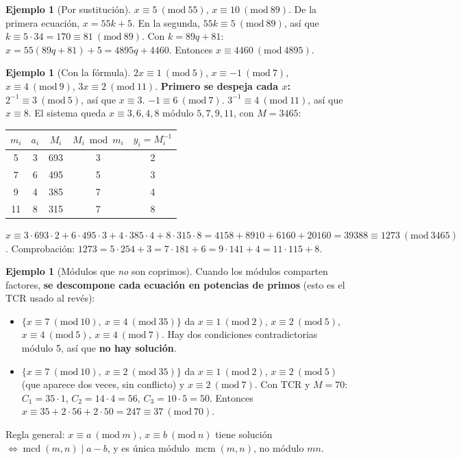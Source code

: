 \documentclass[11pt,a4paper]{article}
\theoremstyle{definition}
\newtheorem{ejemplo}[teorema]{Ejemplo}
\newcommand{\md}[1]{\ (\mathrm{mod}\ #1)}
\newcommand{\mcd}{\operatorname{mcd}}
\newcommand{\mcm}{\operatorname{mcm}}
\theoremstyle{notait}
\theoremstyle{nota}
\begin{document}
\begin{ejemplo}[Por sustitución]
$x\equiv5\md{55}$, $x\equiv10\md{89}$. De la primera ecuación, $x=55k+5$. En la segunda, $55k\equiv5\md{89}$, así que $k\equiv5\cdot34=170\equiv81\md{89}$. Con $k=89q+81$: $x=55(89q+81)+5=4895q+4460$. Entonces $x\equiv4460\md{4895}$.
\end{ejemplo}

\begin{ejemplo}[Con la fórmula]
$2x\equiv1\md5$, $x\equiv-1\md7$, $x\equiv4\md9$, $3x\equiv2\md{11}$. \textbf{Primero se despeja cada $x$:} $2^{-1}\equiv3\md 5$, así que $x\equiv3$. $-1\equiv6\md7$. $3^{-1}\equiv4\md{11}$, así que $x\equiv8$. El sistema queda $x\equiv3,6,4,8$ módulo $5,7,9,11$, con $M=3465$:
\begin{center}
\begin{tabular}{ccccc}
\toprule
$m_i$ & $a_i$ & $M_i$ & $M_i\bmod m_i$ & $y_i=M_i^{-1}$\\
\midrule
5 & 3 & 693 & 3 & 2\\
7 & 6 & 495 & 5 & 3\\
9 & 4 & 385 & 7 & 4\\
11 & 8 & 315 & 7 & 8\\
\bottomrule
\end{tabular}
\end{center}
$x\equiv3\cdot693\cdot2+6\cdot495\cdot3+4\cdot385\cdot4+8\cdot315\cdot8=4158+8910+6160+20160=39388\equiv1273\md{3465}$.
Comprobación: $1273=5\cdot254+3=7\cdot181+6=9\cdot141+4=11\cdot115+8$.
\end{ejemplo}

\begin{ejemplo}[Módulos que \emph{no} son coprimos]
Cuando los módulos comparten factores, \textbf{se descompone cada ecuación en potencias de primos} (esto es el TCR usado al revés):
\begin{itemize}
\item $\{x\equiv7\md{10},\ x\equiv4\md{35}\}$ da $x\equiv1\md2$, $x\equiv2\md5$, $x\equiv4\md5$, $x\equiv4\md7$. Hay dos condiciones contradictorias módulo 5, así que \textbf{no hay solución}.
\item $\{x\equiv7\md{10},\ x\equiv2\md{35}\}$ da $x\equiv1\md2$, $x\equiv2\md5$ (que aparece dos veces, sin conflicto) y $x\equiv2\md7$. Con TCR y $M=70$: $C_1=35\cdot1$, $C_2=14\cdot4=56$, $C_3=10\cdot5=50$. Entonces $x\equiv35+2\cdot56+2\cdot50=247\equiv37\md{70}$.
\end{itemize}
Regla general: $x\equiv a\md m$, $x\equiv b\md n$ tiene solución $\iff\mcd(m,n)\mid a-b$, y es única módulo $\mcm(m,n)$, no módulo $mn$.
\end{ejemplo}
\end{document}
